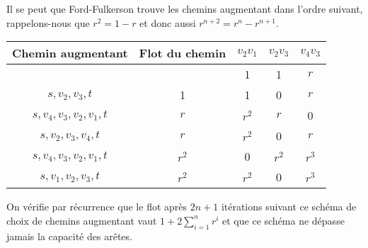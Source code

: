 \begin{solution}
\begin{itemize}
      Il se peut que Ford-Fulkerson
      trouve les chemins augmentant dans l'ordre suivant,
      rappelons-nous que $r^2 = 1 - r$ et donc aussi $r^{n+2} = r^n - r^{n+1}$.
      \begin{center}
        \begin{tabular}{|c|c|c|c|c|}
          \hline
          Chemin augmentant & Flot du chemin & $v_2v_1$ & $v_2v_3$ & $v_4v_3$\\
          \hline
          & & 1 & 1 & $r$\\
          \hline
          $s, v_2, v_3, t$ & 1 & 1 & 0 & $r$\\
          \hline
          $s, v_4, v_3, v_2, v_1, t$ & $r$ & $r^2$ & $r$ & 0\\
          \hline
          $s, v_2, v_3, v_4, t$ & $r$ & $r^2$ & 0 & $r$\\
          \hline
          $s, v_4, v_3, v_2, v_1, t$ & $r^2$ & 0 & $r^2$ & $r^3$\\
          \hline
          $s, v_1, v_2, v_3, t$ & $r^2$ & $r^2$ & 0 & $r^3$\\
          \hline
        \end{tabular}
      \end{center}
      On vérifie par récurrence que le flot après $2n+1$ itérations suivant
      ce schéma de choix de chemins augmentant vaut $1 + 2\sum_{i=1}^n r^i$
      et que ce schéma ne dépasse jamais la capacité des arêtes.


\end{itemize}
\end{solution}
